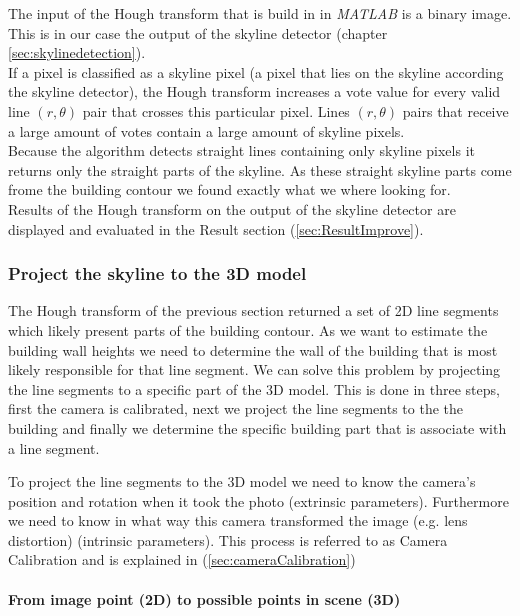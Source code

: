 	The input of the Hough transform that is build in in \emph{MATLAB\cite{matlab}} is a binary
	image. This is in our case the output of the skyline detector (chapter
	\ref{sec:skylinedetection}).\\
	If a pixel is classified as a skyline pixel (a pixel that lies on the
	skyline according the skyline detector), the Hough transform increases
	a vote value for every valid line $(r,\theta)$ pair that crosses this
	particular pixel.  
	Lines $(r,\theta)$ pairs that receive a large amount of votes
	contain a large amount of skyline pixels.\\
	Because the algorithm detects straight lines containing only skyline pixels
	it returns only the straight parts of the skyline.
	As these straight skyline parts come frome the building contour
	we found exactly what we where looking for.\\

	Results of the Hough transform on the output of the skyline detector are
	displayed and evaluated in the Result section (\ref{sec:ResultImprove}).

\subsubsection{Project the skyline to the 3D model}
\label{sec:project}

	The Hough transform of the previous section returned a set of 2D line
	segments which likely present parts of the building contour.  
	As we want to estimate the building wall heights we need to determine the wall
	of the building that is most likely responsible for that line segment.
	We can solve this problem by projecting the line segments to a specific
	part of the 3D model.  
	This is done in three steps, first the camera is calibrated, next we
	project the line segments to the the building and finally we 
	determine the specific building part that is associate with a line segment.

	To project the line segments to the 3D model we need to know the
	camera's position and rotation when it took the photo (extrinsic
	parameters). Furthermore we need to know in what way this camera transformed
	the image (e.g. lens distortion) (intrinsic parameters).
	This process is referred to as Camera Calibration and is explained in 
	(\ref{sec:cameraCalibration})
	 
	\paragraph{From image point (2D) to possible points in scene (3D)} 

